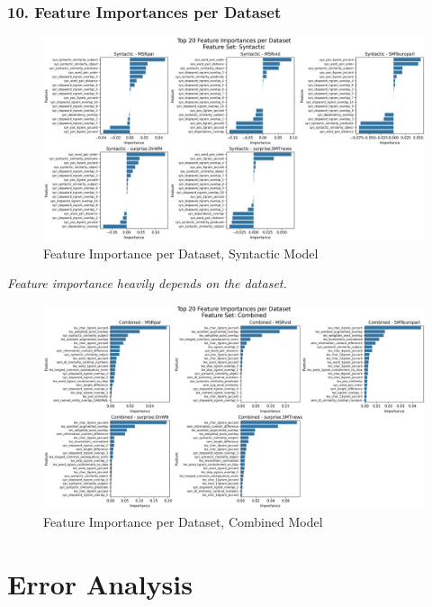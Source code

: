 \documentclass{beamer}
\begin{document}
\begin{frame}[allowframebreaks]
  \frametitle{10. Feature Importances per Dataset}
  \begin{figure}
    \centering
    \includegraphics[width=0.9\linewidth]{img/FI_dataset_Syntactic.png}
    \caption{Feature Importance per Dataset, Syntactic Model}
  \end{figure}
  \centering
  \textit{Feature importance heavily depends on the dataset.}

  \begin{figure}
    \centering
    \includegraphics[width=\linewidth]{img/FI_dataset_Combined.png}
    \caption{Feature Importance per Dataset, Combined Model}
  \end{figure}
  \centering
\end{frame}

\section{Error Analysis}
\end{document}
